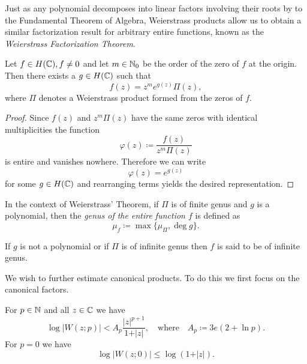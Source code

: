 Just as any polynomial decomposes into linear factors involving their roots by to the Fundamental Theorem of Algebra, Weierstrass products allow us to obtain a similar factorization result for arbitrary entire functions, known as the \emph{Weierstrass Factorization Theorem}.

\begin{theorem}[Weierstrass] \label{thm:weierstrass}
    Let $f \in H(\mathbb{C}), f \neq 0$ and let $m \in \mathbb{N}_0$ be the order of the zero of $f$ at the origin. Then there exists a $g \in H(\mathbb{C})$ such that
    \begin{equation}
        f(z) = z^m e^{g(z)} \Pi(z),
    \end{equation}
    where $\Pi$ denotes a Weierstrass product formed from the zeros of $f$.
\end{theorem}

\begin{proof}
    Since $f(z)$ and $z^m \Pi(z)$ have the same zeros with identical multiplicities the function
    $$ \varphi(z) \coloneqq \frac{f(z)}{z^m \Pi(z)} $$
    is entire and vanishes nowhere. Therefore we can write
    $$ \varphi(z) = e^{g(z)} $$
    for some $g \in H(\mathbb{C})$ and rearranging terms yields the desired representation.
\end{proof}

\begin{definition} \label{def:genus}
    In the context of Weierstrass' Theorem, if $\Pi$ is of finite genus and $g$ is a polynomial, then the \emph{genus of the entire function $f$} is defined as
    \begin{equation}
        \mu_f \coloneqq \max \{ \mu_\Pi, \deg g \}.
    \end{equation}

    If $g$ is not a polynomial or if $\Pi$ is of infinite genus then $f$ is said to be of infinite genus.
\end{definition}

We wish to further estimate canonical products. To do this we first focus on the canonical factors.

\begin{lemma}
    For $p \in \mathbb{N}$ and all $z \in \mathbb{C}$ we have
    \begin{equation}
        \log \vert W(z; p) \vert < A_p \frac{\vert z \vert^{p+1}}{1 + \vert z \vert}, \quad \textrm{where} \quad A_p \coloneqq 3e (2 + \ln p).
    \end{equation}
    For $p = 0$ we have
    \begin{equation}
        \log \vert W(z; 0) \vert \leq \log (1 + \vert z \vert).
    \end{equation}
\end{lemma}

